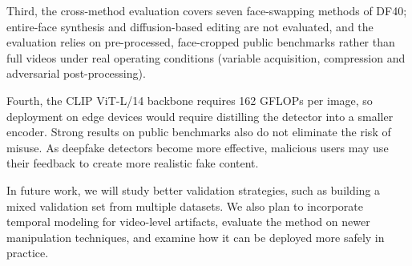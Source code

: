 \documentclass[fonts]{icst}
\newif\ifrevmark\revmarktrue
\newcommand{\rev}[1]{\ifrevmark{\color{revblue}#1}\else#1\fi}
\begin{document}
\rev{Third, the cross-method evaluation covers seven face-swapping methods of DF40; entire-face synthesis and diffusion-based editing are not evaluated, and the evaluation relies on pre-processed, face-cropped public benchmarks rather than full videos under real operating conditions (variable acquisition, compression and adversarial post-processing).}

\rev{Fourth, the CLIP ViT-L/14 backbone requires 162 GFLOPs per image, so deployment on edge devices would require distilling the detector into a smaller encoder.} Strong results on public benchmarks also do not eliminate the risk of misuse. As deepfake detectors become more effective, malicious users may use their feedback to create more realistic fake content.

In future work, we will study better validation strategies, such as building a mixed validation set from multiple datasets. We also plan to incorporate temporal modeling for video-level artifacts, evaluate the method on newer manipulation techniques, and examine how it can be deployed more safely in practice.
\end{document}
